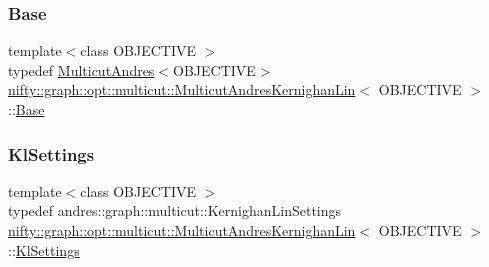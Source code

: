 \subsubsection{\texorpdfstring{Base}{Base}}
{\footnotesize\ttfamily template$<$class O\+B\+J\+E\+C\+T\+I\+VE $>$ \\
typedef \hyperlink{classnifty_1_1graph_1_1opt_1_1multicut_1_1MulticutAndres}{Multicut\+Andres}$<$O\+B\+J\+E\+C\+T\+I\+VE$>$ \hyperlink{classnifty_1_1graph_1_1opt_1_1multicut_1_1MulticutAndresKernighanLin}{nifty\+::graph\+::opt\+::multicut\+::\+Multicut\+Andres\+Kernighan\+Lin}$<$ O\+B\+J\+E\+C\+T\+I\+VE $>$\+::\hyperlink{classnifty_1_1graph_1_1opt_1_1multicut_1_1MulticutAndresKernighanLin_ab78f50b4aea673a5906827b7edae099f}{Base}}

\mbox{\label{classnifty_1_1graph_1_1opt_1_1multicut_1_1MulticutAndresKernighanLin_aed67f0394e2e8a7b91440a52ce2a105f}} 
\subsubsection{\texorpdfstring{Kl\+Settings}{KlSettings}}
{\footnotesize\ttfamily template$<$class O\+B\+J\+E\+C\+T\+I\+VE $>$ \\
typedef andres\+::graph\+::multicut\+::\+Kernighan\+Lin\+Settings \hyperlink{classnifty_1_1graph_1_1opt_1_1multicut_1_1MulticutAndresKernighanLin}{nifty\+::graph\+::opt\+::multicut\+::\+Multicut\+Andres\+Kernighan\+Lin}$<$ O\+B\+J\+E\+C\+T\+I\+VE $>$\+::\hyperlink{classnifty_1_1graph_1_1opt_1_1multicut_1_1MulticutAndresKernighanLin_aed67f0394e2e8a7b91440a52ce2a105f}{Kl\+Settings}}

\mbox{\label{classnifty_1_1graph_1_1opt_1_1multicut_1_1MulticutAndresKernighanLin_a130051fae5c39b5ff6e52b363b07e70b}} 
